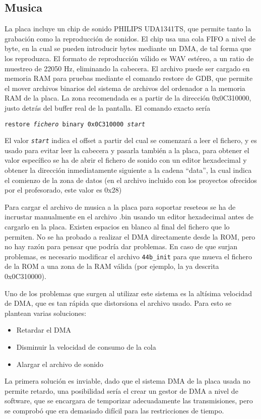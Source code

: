\documentclass[12pt,letterpaper]{article}
\begin{document}
\subsection{Musica}
\label{subsec:musica}
La placa incluye un chip de sonido PHILIPS UDA1341TS, que permite
tanto la grabación como la reproducción de sonidos. El chip usa una
cola FIFO a nivel de byte, en la cual se pueden introducir bytes
mediante un DMA, de tal forma que los reproduzca. El formato de
reproducción válido es WAV estéreo, a un ratio de muestreo de 22050
Hz, eliminando la cabecera. El archivo puede ser cargado en memoria
RAM para pruebas mediante el comando restore de GDB, que permite el
mover archivos binarios del sistema de archivos del ordenador a la
memoria RAM de la placa. La zona recomendada es a partir de la
dirección 0x0C310000, justo detrás del buffer real de la pantalla. El
comando exacto sería

\texttt{restore \textit{fichero} binary 0x0C310000 \textit{start}} 

El valor \texttt{\textit{start}} indica el offset a partir del cual se
comenzará a leer el fichero, y es usado para evitar leer la cabecera y
pasarla también a la placa, para obtener el valor específico se ha de
abrir el fichero de sonido con un editor hexadecimal y obtener la
dirección inmediatamente siguiente a la cadena ``data'', la cual
indica el comienzo de la zona de datos (en el archivo incluido con los
proyectos ofrecidos por el profesorado, este valor es 0x28)

Para cargar el archivo de musica a la placa para soportar reseteos se
ha de incrustar manualmente en el archivo .bin usando un editor
hexadecimal antes de cargarlo en la placa. Existen espacios en blanco
al final del fichero que lo permiten. No se ha probado a realizar el
DMA directamente desde la ROM, pero no hay razón para pensar que
podría dar problemas. En caso de que surjan problemas, es necesario
modificar el archivo \texttt{44b\_init} para que mueva el fichero de
la ROM a una zona de la RAM válida (por ejemplo, la ya descrita
0x0C310000).

Uno de los problemas que surgen al utilizar este sistema es la
altísima velocidad de DMA, que es tan rápida que distorsiona el
archivo usado. Para esto se plantean varias soluciones:
\begin{itemize}
  \item Retardar el DMA
  \item Disminuir la velocidad de consumo de la cola
  \item Alargar el archivo de sonido
\end{itemize}
La primera solución es inviable, dado que el sistema DMA de la placa
usada no permite retardo, una posibilidad sería el crear un gestor de
DMA a nivel de software, que se encargara de temporizar adecuadamente
las transmisiones, pero se comprobó que era demasiado difícil para las
restricciones de tiempo.
\end{document}
